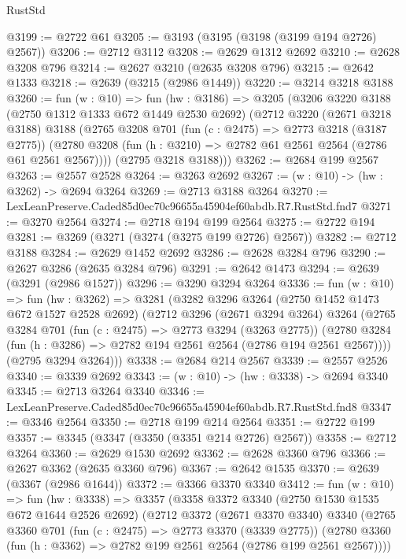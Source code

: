 \begin{lexlean}{RustStd}
\begin{coremodule}
@3199 := @2722 @61
@3205 := @3193 (@3195 (@3198 (@3199 @194 @2726) @2567))
@3206 := @2712 @3112
@3208 := @2629 @1312 @2692
@3210 := @2628 @3208 @796
@3214 := @2627 @3210 (@2635 @3208 @796)
@3215 := @2642 @1333
@3218 := @2639 (@3215 (@2986 @1449))
@3220 := @3214 @3218 @3188
@3260 := fun (w : @10) =>
  fun (hw : @3186) =>
  @3205
    (@3206
      @3220
      @3188
      (@2750 @1312 @1333 @672 @1449 @2530 @2692)
      (@2712
        @3220
        (@2671 @3218 @3188)
        @3188
        (@2765
          @3208
          @701
          (fun (c : @2475) => @2773 @3218 (@3187 @2775))
          (@2780 @3208 (fun (h : @3210) => @2782 @61 @2561 @2564 (@2786 @61 @2561 @2567))))
        (@2795 @3218 @3188)))
@3262 := @2684 @199 @2567
@3263 := @2557 @2528
@3264 := @3263 @2692
@3267 := (w : @10) -> (hw : @3262) -> @2694 @3264
@3269 := @2713 @3188 @3264
@3270 := LexLeanPreserve.Caded85d0ec70c96655a45904ef60abdb.R7.RustStd.fnd7
@3271 := @3270 @2564
@3274 := @2718 @194 @199 @2564
@3275 := @2722 @194
@3281 := @3269 (@3271 (@3274 (@3275 @199 @2726) @2567))
@3282 := @2712 @3188
@3284 := @2629 @1452 @2692
@3286 := @2628 @3284 @796
@3290 := @2627 @3286 (@2635 @3284 @796)
@3291 := @2642 @1473
@3294 := @2639 (@3291 (@2986 @1527))
@3296 := @3290 @3294 @3264
@3336 := fun (w : @10) =>
  fun (hw : @3262) =>
  @3281
    (@3282
      @3296
      @3264
      (@2750 @1452 @1473 @672 @1527 @2528 @2692)
      (@2712
        @3296
        (@2671 @3294 @3264)
        @3264
        (@2765
          @3284
          @701
          (fun (c : @2475) => @2773 @3294 (@3263 @2775))
          (@2780 @3284 (fun (h : @3286) => @2782 @194 @2561 @2564 (@2786 @194 @2561 @2567))))
        (@2795 @3294 @3264)))
@3338 := @2684 @214 @2567
@3339 := @2557 @2526
@3340 := @3339 @2692
@3343 := (w : @10) -> (hw : @3338) -> @2694 @3340
@3345 := @2713 @3264 @3340
@3346 := LexLeanPreserve.Caded85d0ec70c96655a45904ef60abdb.R7.RustStd.fnd8
@3347 := @3346 @2564
@3350 := @2718 @199 @214 @2564
@3351 := @2722 @199
@3357 := @3345 (@3347 (@3350 (@3351 @214 @2726) @2567))
@3358 := @2712 @3264
@3360 := @2629 @1530 @2692
@3362 := @2628 @3360 @796
@3366 := @2627 @3362 (@2635 @3360 @796)
@3367 := @2642 @1535
@3370 := @2639 (@3367 (@2986 @1644))
@3372 := @3366 @3370 @3340
@3412 := fun (w : @10) =>
  fun (hw : @3338) =>
  @3357
    (@3358
      @3372
      @3340
      (@2750 @1530 @1535 @672 @1644 @2526 @2692)
      (@2712
        @3372
        (@2671 @3370 @3340)
        @3340
        (@2765
          @3360
          @701
          (fun (c : @2475) => @2773 @3370 (@3339 @2775))
          (@2780 @3360 (fun (h : @3362) => @2782 @199 @2561 @2564 (@2786 @199 @2561 @2567))))

\end{coremodule}
\end{lexlean}
